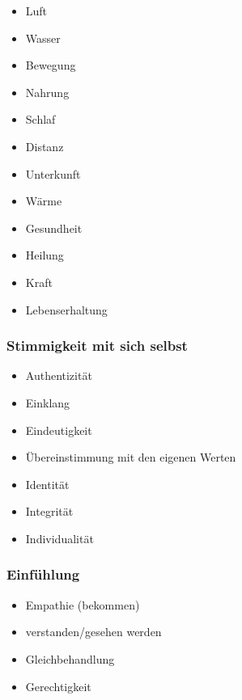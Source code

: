 \begin{multicols}{2}
  \begin{itemize}
    \item Luft
    \item Wasser
    \item Bewegung
    \item Nahrung
    \item Schlaf
    \item Distanz
    \item Unterkunft
    \item Wärme
    \item Gesundheit
    \item Heilung
    \item Kraft
    \item Lebenserhaltung
  \end{itemize}
\end{multicols}


\subsubsection{Stimmigkeit mit sich selbst}

\begin{multicols}{2}
  \begin{itemize}
    \item Authentizität
    \item Einklang
    \item Eindeutigkeit
    \item Übereinstimmung mit den eigenen Werten
    \item Identität
    \item Integrität
    \item Individualität
  \end{itemize}
\end{multicols}


\subsubsection{Einfühlung}

\begin{multicols}{2}
  \begin{itemize}
    \item Empathie (bekommen)
    \item verstanden/gesehen werden
    \item Gleichbehandlung
    \item Gerechtigkeit
  \end{itemize}
\end{multicols}


